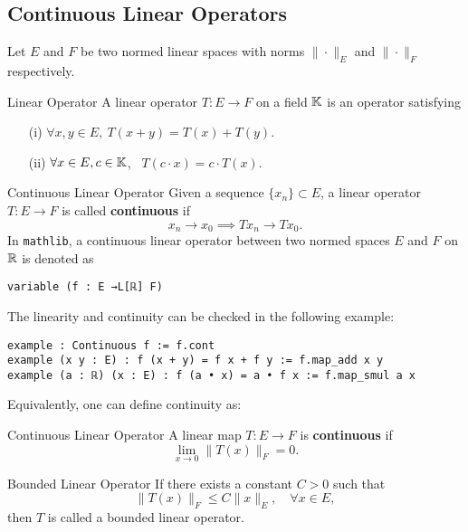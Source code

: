 \documentclass[a4paper]{article}
\begin{document}
\subsection{Continuous Linear Operators}

Let \(E\) and \(F\) be two normed linear spaces with norms \(\|\cdot\|_E\) and \(\|\cdot\|_F\) respectively.

\begin{dfn}{Linear Operator}
A linear operator $T :E\to F$ on a field $\operatorname{\mathbb{K}}$ is an operator satisfying
\begin{itemize}
    \item[(i)] $\forall x,y \in E, \ T (x + y) =T(x) + T(y)$.
    \item[(ii)] $\forall x \in E, c \in \operatorname{\mathbb{K}}$, \ $T (c \cdot x) = c \cdot T(x)$.
\end{itemize}
\end{dfn}

\begin{dfn}{Continuous Linear Operator}  
Given a sequence \(\{x_n\} \subset E\), a linear operator \(T : E \to F\) is called \textbf{continuous} if  
\[
x_n \to x_0 \implies T x_n \to T x_0.
\]
In \texttt{mathlib}, a continuous linear operator between two normed spaces $E$ and $F$ on $\operatorname{\mathbb{R}}$ is denoted as
\begin{lstlisting}[style = lean]
variable (f : E →L[ℝ] F)
\end{lstlisting}
\end{dfn}
The linearity and continuity can be checked in the following example:
\begin{xmp}{}
\begin{lstlisting}[style = lean]
example : Continuous f := f.cont
example (x y : E) : f (x + y) = f x + f y := f.map_add x y
example (a : ℝ) (x : E) : f (a • x) = a • f x := f.map_smul a x
\end{lstlisting}
\end{xmp}


Equivalently, one can define continuity as:

\begin{dfn}{Continuous Linear Operator}  
A linear map \(T : E \to F\) is \textbf{continuous} if  
\[
\lim_{x \to 0} \|T(x)\|_F = 0.
\]
\end{dfn}

\begin{dfn}{Bounded Linear Operator}  
If there exists a constant \(C > 0\) such that  
\[
\|T(x)\|_F \leq C \|x\|_E, \quad \forall x \in E,
\]  
then \(T\) is called a bounded linear operator.  
\end{dfn}
\end{document}
